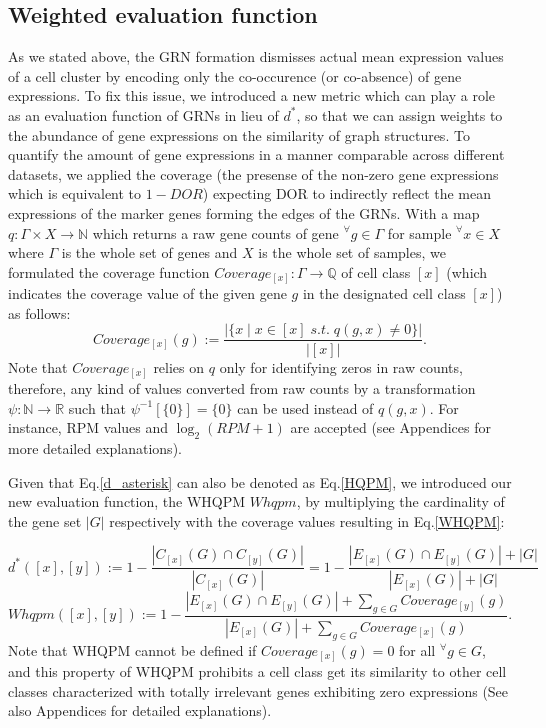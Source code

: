 \documentclass{article}
\begin{document}
\subsection*{Weighted evaluation function}
As we stated above, the GRN formation dismisses actual mean expression values of a cell cluster by encoding only 
the co-occurence (or co-absence) of gene expressions. To fix this issue, we introduced a new metric which can play a 
role as an evaluation function of GRNs in lieu of $d^*$, so that we can assign weights to the abundance of 
gene expressions on the similarity of graph structures. To quantify the amount of gene expressions in a manner 
comparable across different datasets, we applied the coverage (the presense of the non-zero gene expressions which 
is equivalent to $1-DOR$) expecting DOR to indirectly reflect the mean expressions of the marker genes forming 
the edges of the GRNs. With a map $q: \Gamma\times X\rightarrow \mathbb{N}$ which returns a raw gene counts of gene $^\forall g\in\Gamma$ for sample 
$^\forall x\in X$ where $\Gamma$ is the whole set of genes and $X$ is the whole set of samples, we formulated the coverage function 
$Coverage_{[x]}: \Gamma\rightarrow\mathbb{Q}$ of cell class $[x]$ (which indicates the coverage value of the given gene $g$ in the designated cell 
class $[x]$) as follows:
\begin{equation}\label{coverage}
  Coverage_{[x]}(g):=\frac{
    |\{x\;|\;x\in[x]\;s.t.\;q(g,x)\neq 0\}|
  }{
    |[x]|
  }.
\end{equation}
Note that $Coverage_{[x]}$ relies on $q$ only for identifying zeros in raw counts, therefore, 
any kind of values converted from raw counts by a transformation $\psi: \mathbb{N}\rightarrow\mathbb{R}$ 
such that $\psi^{-1}[\{0\}]=\{0\}$ can be used instead of $q(g, x)$. For instance, \ac{RPM} values 
and $\log_2(RPM+1)$ are accepted (see Appendices for more detailed explanations).

Given that Eq.\eqref{d_asterisk} can also be denoted as Eq.\eqref{HQPM}, we introduced our new evaluation function, the \ac{WHQPM} 
$Whqpm$, by multiplying the cardinality of the gene set $|G|$ respectively 
with the coverage values resulting in Eq.\eqref{WHQPM}:

\begin{equation}\label{HQPM}
  d^*([x], [y]) := 1 - \frac{|C_{[x]}(G)\cap C_{[y]}(G)|}{|C_{[x]}(G)|}
  =1 - \frac{
    |E_{[x]}(G)\cap E_{[y]}(G)|+|G|
  }{
    |E_{[x]}(G)|+|G|
  }
\end{equation}
\begin{equation}\label{WHQPM}
  Whqpm([x], [y]) := 1 - \frac{
    |E_{[x]}(G)\cap E_{[y]}(G)|+\sum_{g\in G}Coverage_{[y]}(g)
  }{
    |E_{[x]}(G)|+\sum_{g\in G}Coverage_{[x]}(g)
  }.
\end{equation}
Note that \ac{WHQPM} cannot be defined if $Coverage_{[x]}(g)=0$ for all $^\forall g\in G$, and this property of WHQPM prohibits 
a cell class get its similarity to other cell classes characterized with totally irrelevant genes exhibiting zero expressions 
(See also Appendices for detailed explanations).
\end{document}
